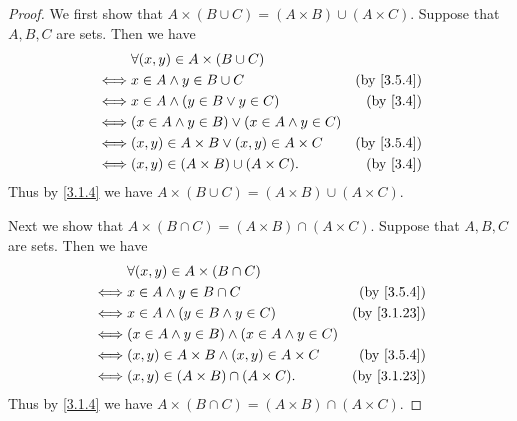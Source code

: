 \begin{proof}
  We first show that \(A \times (B \cup C) = (A \times B) \cup (A \times C)\).
  Suppose that \(A, B, C\) are sets.
  Then we have
  \begin{align*}
         & \forall (x, y) \in A \times (B \cup C)                                          \\
    \iff & x \in A \land y \in B \cup C                         & \text{(by \cref{3.5.4})} \\
    \iff & x \in A \land (y \in B \lor y \in C)                 & \text{(by \cref{3.4})}   \\
    \iff & (x \in A \land y \in B) \lor (x \in A \land y \in C)                            \\
    \iff & (x, y) \in A \times B \lor (x, y) \in A \times C     & \text{(by \cref{3.5.4})} \\
    \iff & (x, y) \in (A \times B) \cup (A \times C).           & \text{(by \cref{3.4})}
  \end{align*}
  Thus by \cref{3.1.4} we have \(A \times (B \cup C) = (A \times B) \cup (A \times C)\).

  Next we show that \(A \times (B \cap C) = (A \times B) \cap (A \times C)\).
  Suppose that \(A, B, C\) are sets.
  Then we have
  \begin{align*}
         & \forall (x, y) \in A \times (B \cap C)                                            \\
    \iff & x \in A \land y \in B \cap C                          & \text{(by \cref{3.5.4})}  \\
    \iff & x \in A \land (y \in B \land y \in C)                 & \text{(by \cref{3.1.23})} \\
    \iff & (x \in A \land y \in B) \land (x \in A \land y \in C)                             \\
    \iff & (x, y) \in A \times B \land (x, y) \in A \times C     & \text{(by \cref{3.5.4})}  \\
    \iff & (x, y) \in (A \times B) \cap (A \times C).            & \text{(by \cref{3.1.23})}
  \end{align*}
  Thus by \cref{3.1.4} we have \(A \times (B \cap C) = (A \times B) \cap (A \times C)\).


\end{proof}
